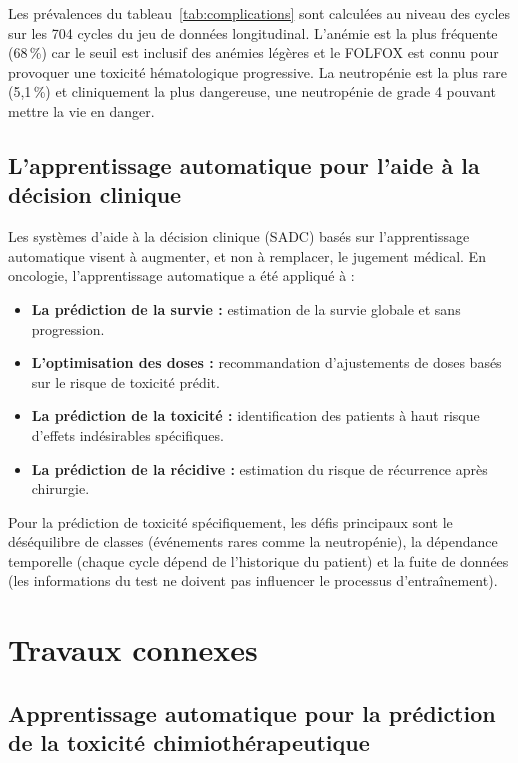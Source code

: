 \documentclass[12pt,a4paper]{report}
\begin{document}
Les prévalences du tableau~\ref{tab:complications} sont calculées au niveau des cycles sur les 704 cycles du jeu de données longitudinal. L'anémie est la plus fréquente (68\,\%) car le seuil est inclusif des anémies légères et le FOLFOX est connu pour provoquer une toxicité hématologique progressive. La neutropénie est la plus rare (5,1\,\%) et cliniquement la plus dangereuse, une neutropénie de grade 4 pouvant mettre la vie en danger.

\section{L'apprentissage automatique pour l'aide à la décision clinique}

Les systèmes d'aide à la décision clinique (SADC) basés sur l'apprentissage automatique visent à augmenter, et non à remplacer, le jugement médical. En oncologie, l'apprentissage automatique a été appliqué à :
\begin{itemize}
  \item \textbf{La prédiction de la survie :} estimation de la survie globale et sans progression.
  \item \textbf{L'optimisation des doses :} recommandation d'ajustements de doses basés sur le risque de toxicité prédit.
  \item \textbf{La prédiction de la toxicité :} identification des patients à haut risque d'effets indésirables spécifiques.
  \item \textbf{La prédiction de la récidive :} estimation du risque de récurrence après chirurgie.
\end{itemize}

Pour la prédiction de toxicité spécifiquement, les défis principaux sont le déséquilibre de classes (événements rares comme la neutropénie), la dépendance temporelle (chaque cycle dépend de l'historique du patient) et la fuite de données (les informations du test ne doivent pas influencer le processus d'entraînement).

\chapter{Travaux connexes}
\label{chap:related}

\section{Apprentissage automatique pour la prédiction de la toxicité chimiothérapeutique}
\end{document}
